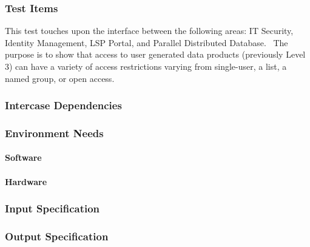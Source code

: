 \subsubsection{Test Items}
This test touches upon the interface between the following areas: IT
Security, Identity Management, LSP Portal, and Parallel Distributed
Database. ~The purpose is to show that access to user generated data
products (previously Level 3) can have a variety of access restrictions
varying from single-user, a list, a named group, or open access.



\subsubsection{Intercase Dependencies}

\subsubsection{Environment Needs}

\paragraph{Software}

\paragraph{Hardware}

\subsubsection{Input Specification}



\subsubsection{Output Specification}

